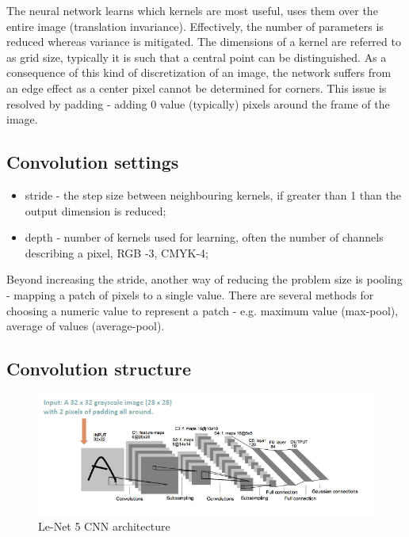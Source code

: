 \documentclass[11pt]{book}
\begin{document}
The neural network learns which kernels are most useful, uses them over the entire image (translation invariance). Effectively, the number of parameters is reduced whereas variance is mitigated. The dimensions of a kernel are referred to as grid size, typically it is such that a central point can be distinguished. As a consequence of this kind of discretization of an image, the network suffers from an edge effect as a center pixel cannot be determined for corners. This issue is resolved by padding - adding 0 value (typically) pixels around the frame of the image.

\subsection{Convolution settings}

\begin{itemize}
\item stride - the step size between neighbouring kernels, if greater than 1 than the output dimension is reduced;
\item depth - number of kernels used for learning, often the number of channels describing a pixel, RGB -3, CMYK-4;
\end{itemize}

Beyond increasing the stride, another way of reducing the problem size is pooling - mapping a patch of pixels to a single value. There are several methods for choosing a numeric value to represent a patch - e.g. maximum value (max-pool), average of values (average-pool).

\subsection{Convolution structure}

\begin{figure}[H]
    \centering
    \includegraphics[width=1\linewidth]{lenet.PNG}
    \caption{Le-Net 5 CNN architecture}
\end{figure}
\end{document}
